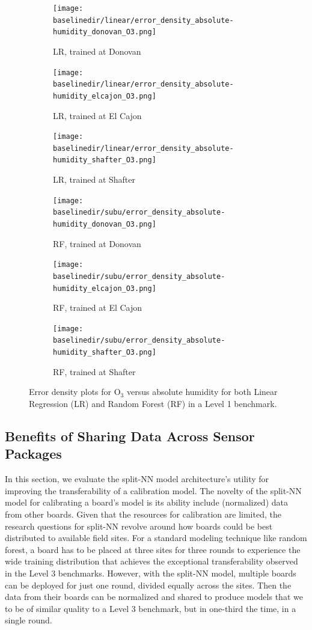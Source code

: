 \documentclass[journal abbreviation, manuscript]{copernicus}
\newcommand{\textus}[1]{$_{\text{#1}}$}
\begin{document}
\begin{figure}[H]
\centering
\begin{subfigure}{0.33\textwidth}
\texttt{[image: \\baselinedir/linear/error\_density\_absolute-humidity\_donovan\_O3.png]}
\caption{LR, trained at Donovan}
\end{subfigure}
\begin{subfigure}{0.33\textwidth}
\texttt{[image: \\baselinedir/linear/error\_density\_absolute-humidity\_elcajon\_O3.png]}
\caption{LR, trained at El Cajon}
\end{subfigure}
\begin{subfigure}{0.33\textwidth}
\texttt{[image: \\baselinedir/linear/error\_density\_absolute-humidity\_shafter\_O3.png]}
\caption{LR, trained at Shafter}
\end{subfigure}
\begin{subfigure}{0.33\textwidth}
\texttt{[image: \\baselinedir/subu/error\_density\_absolute-humidity\_donovan\_O3.png]}
\caption{RF, trained at Donovan}
\end{subfigure}
\begin{subfigure}{0.33\textwidth}
\texttt{[image: \\baselinedir/subu/error\_density\_absolute-humidity\_elcajon\_O3.png]}
\caption{RF, trained at El Cajon}
\end{subfigure}
\begin{subfigure}{0.33\textwidth}
\texttt{[image: \\baselinedir/subu/error\_density\_absolute-humidity\_shafter\_O3.png]}
\caption{RF, trained at Shafter}
\end{subfigure}
\caption{Error density plots for O\textus{3} versus absolute humidity for both Linear Regression (LR) and Random Forest (RF) in a Level 1 benchmark.}
\label{fig:error-density}
\end{figure}


\subsection{Benefits of Sharing Data Across Sensor Packages}
In this section, we evaluate the split-NN model architecture's utility for improving the transferability of a calibration model.  The novelty of the split-NN model for calibrating a board's model is its ability include (normalized) data from other boards.  Given that the resources for calibration are limited, the research questions for split-NN revolve around how boards could be best distributed to available field sites.  For a standard modeling technique like random forest, a board has to be placed at three sites for three rounds to experience the wide training distribution that achieves the exceptional transferability observed in the Level 3 benchmarks.  However, with the split-NN model, multiple boards can be deployed for just one round, divided equally across the sites.  Then the data from their boards can be normalized and shared to produce models that we to be of similar quality to a Level 3 benchmark, but in one-third the time, in a single round.
\end{document}
